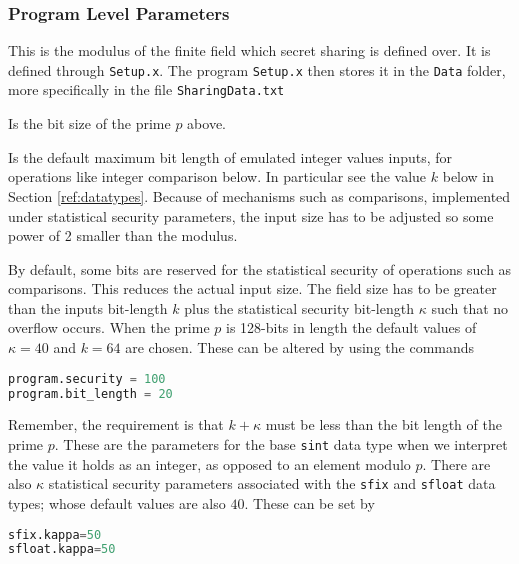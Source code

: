 \subsubsection{Program Level Parameters}

This is the modulus of the finite field which secret sharing is defined over.
It is defined through \verb|Setup.x|. 
The program \verb+Setup.x+ then stores it in the \verb|Data| folder, more specifically in the file \verb|SharingData.txt|

Is the bit size of the prime $p$ above. 

Is the default maximum bit length of emulated integer values inputs,
for operations like integer comparison below. 
In particular see the value $k$ below in Section \ref{ref:datatypes}.
Because of mechanisms such as comparisons, implemented under statistical security parameters, the input size has to be adjusted so 
some power of 2 smaller than the modulus. 

By default, some bits are reserved for the statistical security of operations such as comparisons. This reduces the actual input size.
The field size has to be greater than the inputs bit-length $k$ plus the statistical security bit-length $\kappa$ such that no overflow occurs. 
When the prime $p$ is 128-bits in length the default values of $\kappa=40$ and $k=64$ are chosen.
These can be altered by using the commands
\begin{lstlisting}[language={python}]
program.security = 100
program.bit_length = 20
\end{lstlisting}
Remember, the requirement is that $k+\kappa$ must be less than the bit length of the prime $p$.
These are the parameters for the base \verb+sint+ data type when we interpret the value it holds
as an integer, as opposed to an element modulo $p$.
There are also $\kappa$ statistical security parameters associated with the \verb+sfix+ and \verb+sfloat+ data types;
whose default values are also $40$.
These can be set by
\begin{lstlisting}[language={python}]
sfix.kappa=50
sfloat.kappa=50
\end{lstlisting}


